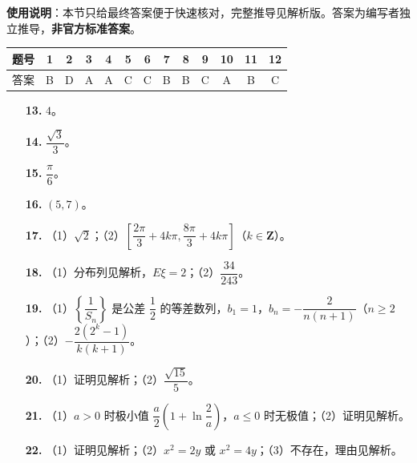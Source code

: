 
\begin{gknotice}
\textbf{使用说明}：本节只给最终答案便于快速核对，完整推导见解析版。答案为编写者独立推导，\textbf{非官方标准答案}。
\end{gknotice}

\begin{center}\begin{tabular}{ccccccccccccc}
\toprule
题号 & 1 & 2 & 3 & 4 & 5 & 6 & 7 & 8 & 9 & 10 & 11 & 12 \\
\midrule
答案 & B & D & A & A & C & C & B & B & C & A & B & C \\
\bottomrule
\end{tabular}\end{center}

\begin{itemize}[leftmargin=2.6em]
  \item[\textbf{13.}] $4$。
  \item[\textbf{14.}] $\dfrac{\sqrt3}3$。
  \item[\textbf{15.}] $\dfrac{\pi}6$。
  \item[\textbf{16.}] $(5,7)$。
\end{itemize}

\begin{itemize}[leftmargin=2.6em]
  \item[\textbf{17.}] （1）$\sqrt2$；（2）$\left[\dfrac{2\pi}3+4k\pi,\dfrac{8\pi}3+4k\pi\right]$（$k\in\mathbf Z$）。
  \item[\textbf{18.}] （1）分布列见解析，$E\xi=2$；（2）$\dfrac{34}{243}$。
  \item[\textbf{19.}] （1）$\left\{\dfrac1{S_n}\right\}$ 是公差 $\dfrac12$ 的等差数列，$b_1=1$，$b_n=-\dfrac{2}{n(n+1)}$（$n\geqslant2$）；（2）$-\dfrac{2(2^k-1)}{k(k+1)}$。
  \item[\textbf{20.}] （1）证明见解析；（2）$\dfrac{\sqrt{15}}5$。
  \item[\textbf{21.}] （1）$a>0$ 时极小值 $\dfrac a2\left(1+\ln\dfrac2a\right)$，$a\leqslant0$ 时无极值；（2）证明见解析。
  \item[\textbf{22.}] （1）证明见解析；（2）$x^2=2y$ 或 $x^2=4y$；（3）不存在，理由见解析。
\end{itemize}
